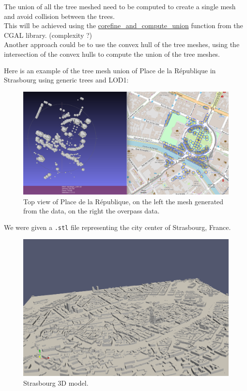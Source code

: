 \documentclass[12pt]{article}
\begin{document}
The union of all the tree meshed need to be computed to create a single mesh
and avoid collision between the trees. \\
This will be achieved using the \href{https://doc.cgal.org/latest/Polygon_mesh_processing/group__PMP__corefinement__grp.html}{corefine\_and\_compute\_union} function from the CGAL library.
(complexity ?) \\
Another approach could be to use the convex hull of the tree meshes, using the
intersection of the convex hulls to compute the union of the tree meshes.

Here is an example of the tree mesh union of Place de la République in Strasbourg
using generic trees and LOD1:

\begin{figure}[H]
    \centering
        \centering
        \includegraphics[width=\textwidth]{images/mesh_vs_overpass.png}
        \caption{Top view of Place de la République, on the left the mesh generated from the data,
        on the right the overpass data.}

\end{figure}


We were given a \texttt{.stl} file representing the city center of Strasbourg, France.

\begin{figure}[H]
    \centering
    \includegraphics[width=1\textwidth]{images/stras_mesh.png}
    \caption{Strasbourg 3D model.}
\end{figure}
\end{document}
